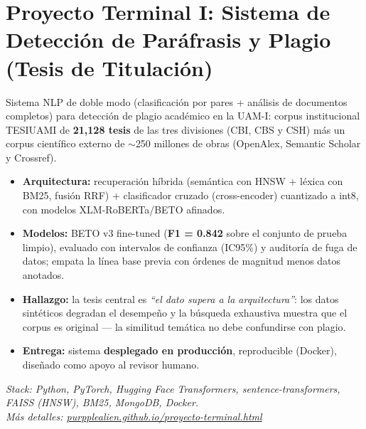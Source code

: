 \documentclass[10pt,letterpaper]{article}
\begin{document}
\section*{Proyecto Terminal I: Sistema de Detecci\'{o}n de Par\'{a}frasis y Plagio (Tesis de Titulaci\'{o}n)}
\justifying
\small
Sistema NLP de doble modo (clasificaci\'{o}n por pares + an\'{a}lisis de documentos completos) para detecci\'{o}n de plagio acad\'{e}mico en la UAM-I: corpus institucional TESIUAMI de \textbf{21{,}128 tesis} de las tres divisiones (CBI, CBS y CSH) m\'{a}s un corpus cient\'{i}fico externo de $\sim$250 millones de obras (OpenAlex, Semantic Scholar y Crossref).
\vspace{0.12cm}
\begin{itemize}
    \item \textbf{Arquitectura:} recuperaci\'{o}n h\'{i}brida (sem\'{a}ntica con HNSW + l\'{e}xica con BM25, fusi\'{o}n RRF) + clasificador cruzado (cross-encoder) cuantizado a int8, con modelos XLM-RoBERTa/BETO afinados.
    \item \textbf{Modelos:} BETO v3 fine-tuned (\textbf{F1 = 0.842} sobre el conjunto de prueba limpio), evaluado con intervalos de confianza (IC95\%) y auditor\'{i}a de fuga de datos; empata la l\'{i}nea base previa con \'{o}rdenes de magnitud menos datos anotados.
    \item \textbf{Hallazgo:} la tesis central es \emph{``el dato supera a la arquitectura''}: los datos sint\'{e}ticos degradan el desempe\~{n}o y la b\'{u}squeda exhaustiva muestra que el corpus es original — la similitud tem\'{a}tica no debe confundirse con plagio.
    \item \textbf{Entrega:} sistema \textbf{desplegado en producci\'{o}n}, reproducible (Docker), dise\~{n}ado como apoyo al revisor humano.
\end{itemize}
\vspace{0.1cm}
{\small\itshape\color{textsec} Stack: Python, PyTorch, Hugging Face Transformers, sentence-transformers, FAISS (HNSW), BM25, MongoDB, Docker.\\ M\'{a}s detalles: \href{https://purpplealien.github.io/proyecto-terminal.html}{purpplealien.github.io/proyecto-terminal.html}}

\vspace{0.5cm}
\end{document}
